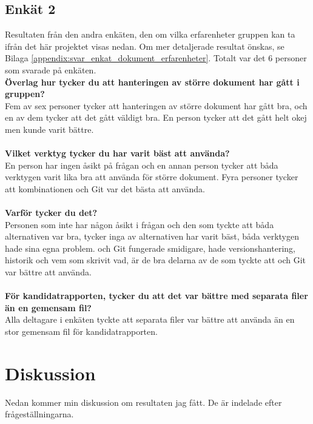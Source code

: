 \subsection{Enkät 2}
Resultaten från den andra enkäten, den om vilka erfarenheter gruppen kan ta ifrån det här projektet visas nedan. Om mer detaljerade resultat önskas, se Bilaga \ref{appendix:svar_enkat_dokument_erfarenheter}. Totalt var det 6 personer som svarade på enkäten.\\
\textbf{Överlag hur tycker du att hanteringen av större dokument har gått i gruppen?}\\
Fem av sex personer tycker att hanteringen av större dokument har gått bra, och en av dem tycker att det gått väldigt bra. En person tycker att det gått helt okej men kunde varit bättre.\\\\
\textbf{Vilket verktyg tycker du har varit bäst att använda?}\\
En person har ingen åsikt på frågan och en annan person tycker att båda verktygen varit lika bra att använda för större dokument. Fyra personer tycker att kombinationen \latex och Git var det bästa att använda.\\\\
\textbf{Varför tycker du det?}\\
Personen som inte har någon åsikt i frågan och den som tyckte att båda alternativen var bra, tycker inga av alternativen har varit bäst, båda verktygen hade sina egna problem. \latex och Git fungerade smidigare, hade versionshantering, historik och vem som skrivit vad, är de bra delarna av de som tyckte att \latex och Git var bättre att använda.\\\\
\textbf{För kandidatrapporten, tycker du att det var bättre med separata filer än en gemensam fil?}\\
Alla deltagare i enkäten tyckte att separata filer var bättre att använda än en stor gemensam fil för kandidatrapporten.

\section{Diskussion}
\label{sec:discussion-tuhkala}
Nedan kommer min diskussion om resultaten jag fått. De är indelade efter frågeställningarna.

